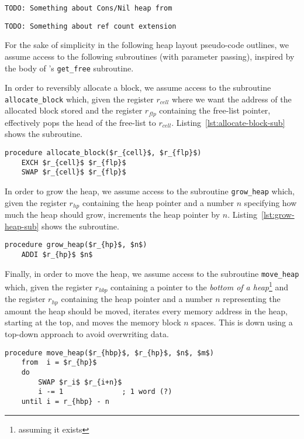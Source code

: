 \texttt{TODO: Something about Cons/Nil heap from~\cite{ha:heap}}

\texttt{TODO: Something about ref count extension~\cite{tm:refcounting}}

For the sake of simplicity in the following heap layout pseudo-code outlines, we assume access to the following subroutines (with parameter passing), inspired by the body of \citeauthor{ha:heap}'s \texttt{get\_free} subroutine.

In order to reversibly allocate a block, we assume access to the subroutine \texttt{allocate\_block} which, given the register $r_{cell}$ where we want the address of the allocated block stored and the register $r_{flp}$ containing the free-list pointer, effectively pops the head of the free-list to  $r_{cell}$. Listing~\ref{lst:allocate-block-sub} shows the subroutine.

\begin{lstlisting}[caption={\texttt{allocate\_block} subroutine}, language=janus, style=basic,label={lst:allocate-block-sub}]
procedure allocate_block($r_{cell}$, $r_{flp}$)
	EXCH $r_{cell}$ $r_{flp}$
	SWAP $r_{cell}$ $r_{flp}$
\end{lstlisting}

In order to grow the heap, we assume access to the subroutine \texttt{grow\_heap} which, given the register $r_{hp}$ containing the heap pointer and a number $n$ specifying how much the heap should grow, increments the heap pointer by $n$. Listing~\ref{lst:grow-heap-sub} shows the subroutine.

\begin{lstlisting}[caption={\texttt{grow\_heap} subroutine}, language=janus, style=basic,label={lst:grow-heap-sub}]
procedure grow_heap($r_{hp}$, $n$)
	ADDI $r_{hp}$ $n$
\end{lstlisting}

Finally, in order to move the heap, we assume access to the subroutine \texttt{move\_heap} which, given the register $r_{hbp}$ containing a pointer to the \textit{bottom of a heap}\footnote{assuming it exists} and the register $r_{hp}$ containing the heap pointer and a number $n$ representing the amount the heap should be moved, iterates every memory address in the heap, starting at the top, and moves the memory block $n$ spaces. This is down using a top-down approach to avoid overwriting data. 

\begin{lstlisting}[caption={\texttt{move\_heap} subroutine}, language=janus, style=basic,label={lst:move-heap-sub}]
procedure move_heap($r_{hbp}$, $r_{hp}$, $n$, $m$)
	from  i = $r_{hp}$
    do
        SWAP $r_i$ $r_{i+n}$
        i -= 1 				; 1 word (?)
    until i = r_{hbp} - n
\end{lstlisting}


